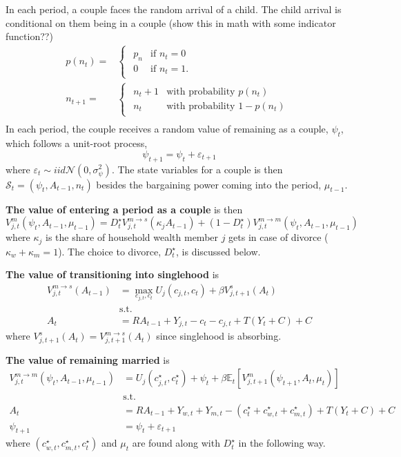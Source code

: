 \documentclass{article}
\begin{document}
In each period, a couple faces the random arrival of a child. The child arrival is conditional on them being in a couple (show this in math with some indicator function??)
\begin{align}
p(n_t)=&\begin{cases}
\begin{array}{ll}
p_n & \text{if } n_{t}=0\\
0 &  \text{if } n_{t}=1.
\end{array}\end{cases} \\ 
n_{t+1}= &\begin{cases}
\begin{array}{ll}
n_{t}+1 & \text{with probability } p(n_{t})\\
n_{t} & \text{with probability } 1-p(n_{t})
\end{array}\end{cases} \\
\end{align}
In each period, the couple receives
a random value of remaining as a couple, $\psi_{t}$, which follows
a unit-root process,
$$
\psi_{t+1}=\psi_{t}+\varepsilon_{t+1}
$$
where $\varepsilon_{t}\sim iid\mathcal{N}(0,\sigma_{\psi}^{2})$.
 The
state variables for a couple is then $\mathcal{S}_{t}=(\psi_{t},A_{t-1}, n_t)$
besides the bargaining power coming into the period, $\mu_{t-1}$.

\textbf{The value of entering a period as a couple} is then
$$
V_{j,t}^{m}(\psi_{t},A_{t-1},\mu_{t-1})=D_{t}^{\star}V_{j,t}^{m\rightarrow s}(\kappa_{j}A_{t-1})+(1-D_{t}^{\star})V_{j,t}^{m\rightarrow m}(\psi_{t},A_{t-1},\mu_{t-1})
$$
where $\kappa_{j}$ is the share of household wealth member $j$ gets
in case of divorce ($\kappa_{w}+\kappa_{m}=1$). The choice to divorce,
$D_{t}^{\star}$, is discussed below.

\textbf{The value of transitioning into singlehood} is
\begin{align*}
V_{j,t}^{m\rightarrow s}(A_{t-1}) & =\max_{c_{j,t},c_{t}}U_{j}(c_{j,t},c_{t})+\beta V_{j,t+1}^{s}(A_{t})\\
 & \text{s.t.}\\
A_{t} & =RA_{t-1}+Y_{j,t}-c_{t}-c_{j,t} + T(Y_t + C) + C
\end{align*}
where $V_{j,t+1}^{s}(A_{t})=V_{j,t+1}^{m\rightarrow s}(A_{t})$ since
singlehood is absorbing.

\textbf{The value of remaining married} is
\begin{align*}
V_{j,t}^{m\rightarrow m}(\psi_{t},A_{t-1},\mu_{t-1}) & =U_{j}(c_{j,t}^{\star},c_{t}^{\star})+\psi_{t}+\beta\mathbb{E}_{t}[V_{j,t+1}^{m}(\psi_{t+1},A_{t},\mu_{t})]\\
 & \text{s.t.}\\
A_{t} & =RA_{t-1}+Y_{w,t}+Y_{m,t}-(c_{t}^{\star}+c_{w,t}^{\star}+c_{m,t}^{\star}) + T(Y_t + C) + C\\
\psi_{t+1} & =\psi_{t}+\varepsilon_{t+1}
\end{align*}
where $(c_{w,t}^{\star},c_{m,t}^{\star},c_{t}^{\star})$ and $\mu_{t}$
are found along with $D_{t}^{\star}$ in the following way.
\end{document}

